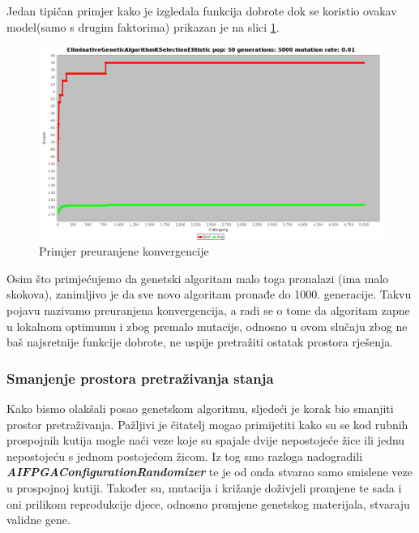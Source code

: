 \documentclass[times, utf8, zavrsni]{fer}
\begin{document}
Jedan tipičan primjer kako je izgledala funkcija dobrote dok se koristio ovakav model(samo s drugim faktorima) prikazan je na slici \ref{fig:sv54-convergence}. 

\begin{figure}[!htb]
	\centering
	\includegraphics[width=18cm]{slike/SV54Convergence.png}
	\caption{Primjer preuranjene konvergencije}
	\label{fig:sv54-convergence}
\end{figure} 

Osim što primjećujemo da genetski algoritam malo toga pronalazi (ima malo skokova), zanimljivo je da sve novo algoritam pronađe do 1000. generacije. Takvu pojavu nazivamo preuranjena konvergencija, a radi se o tome da algoritam zapne u lokalnom optimumu i zbog premalo mutacije, odnosno u ovom slučaju zbog ne baš najsretnije funkcije dobrote, ne uspije pretražiti ostatak prostora rješenja. 

\subsubsection{Smanjenje prostora pretraživanja stanja}

Kako bismo olakšali posao genetskom algoritmu, sljedeći je korak bio smanjiti prostor pretraživanja. Pažljivi je čitatelj mogao primijetiti kako su se kod rubnih prospojnih kutija mogle naći veze koje su spajale dvije nepostojeće žice ili jednu nepostojeću s jednom postojećom žicom. Iz tog smo razloga nadogradili \textbf{\emph{AIFPGAConfigurationRandomizer}} te je od onda stvarao samo smislene veze u prospojnoj kutiji. Također su, mutacija i križanje doživjeli promjene te sada i oni prilikom reprodukcije djece, odnosno promjene genetskog materijala, stvaraju validne gene. 
\end{document}
